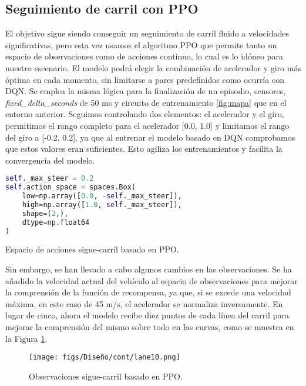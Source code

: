 \subsection{Seguimiento de carril con \ac{PPO}}

El objetivo sigue siendo conseguir un seguimiento de carril fluido a velocidades significativas, pero esta vez usamos el algoritmo \ac{PPO} que permite tanto un espacio de observaciones como de acciones continuo, lo cual es lo idóneo para nuestro escenario. El modelo podrá elegir la combinación de acelerador y giro más óptima en cada momento, sin limitarse a pares predefinidos como ocurría con \ac{DQN}. Se emplea la misma lógica para la finalización de un episodio, sensores, \textit{fixed\_delta\_seconds} de 50 ms y circuito de entrenamiento \ref{fig:mapa} que en el entorno anterior. Seguimos controlando dos elementos: el acelerador y el giro, permitimos el rango completo para el acelerador [0.0, 1.0] y limitamos el rango del giro a [-0.2, 0.2], ya que al entrenar el modelo basado en \ac{DQN} comprobamos que estos valores eran suficientes. Esto agiliza los entrenamientos y facilita la convergencia del modelo.

\begin{code}[h]
\begin{lstlisting}[language=Python]
self._max_steer = 0.2
self.action_space = spaces.Box(
    low=np.array([0.0, -self._max_steer]),
    high=np.array([1.0, self._max_steer]),
    shape=(2,),
    dtype=np.float64
)
\end{lstlisting}
\caption[Espacio de acciones sigue-carril basado en \ac{PPO}]{Espacio de acciones sigue-carril basado en \ac{PPO}.}
\label{cod:acc_ppo}
\end{code}

Sin embargo, se han llevado a cabo algunos cambios en las observaciones. Se ha añadido la velocidad actual del vehículo al espacio de observaciones para mejorar la comprensión de la función de recompensa, ya que, si se excede una velocidad máxima, en este caso de 45 m/s, el acelerador se normaliza inversamente. En lugar de cinco, ahora el modelo recibe diez puntos de cada línea del carril para mejorar la comprensión del mismo sobre todo en las curvas, como se muestra en la Figura \ref{fig:puntos_carril_ppo}.
\begin{figure}[ht]
\centering
\texttt{[image: figs/Diseño/cont/lane10.png]}
\caption{Observaciones sigue-carril basado en \ac{PPO}.}
\label{fig:puntos_carril_ppo}
\end{figure}

